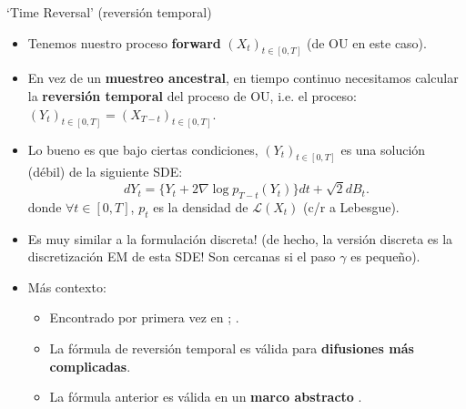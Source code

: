 \documentclass[aspectratio=169,xcolor=dvipsnames, t, spanish]{beamer}
\begin{document}
    \begin{frame}{`Time Reversal' (reversión temporal)}
        \begin{itemize}
        \item Tenemos nuestro proceso \textbf{forward} $(X_{t})_{t\in[0,T]}$ (de OU en este caso).
            \item En vez de un \textbf{muestreo ancestral}, en tiempo continuo necesitamos calcular la \textbf{reversión temporal} del proceso de OU, i.e. el proceso: $(Y_{t})_{t\in[0,T]}=(X_{T-t})_{t\in[0,T]}$.
            \pause
            \item Lo bueno es que bajo ciertas condiciones, $(Y_{t})_{t\in[0,T]}$ es una solución (débil) de la siguiente SDE:\vspace{-2mm}
            \[ dY_{t}=\{Y_{t}+2\nabla \log p_{T-t}(Y_{t})\}dt+\sqrt{2}dB_{t} . \]
            donde $\forall t\in[0,T]$, $p_{t}$ es la densidad de $\mathcal{L}(X_{t})$ (c/r a Lebesgue).
            \pause
            \item Es muy similar a la formulación discreta! (de hecho, la versión discreta es la discretización EM de esta SDE! Son cercanas si el paso $\gamma$ es pequeño).
            \item Más contexto:
            \begin{itemize}
                \item Encontrado por primera vez en \cite{Anderson1982}; \cite{HaussmannPardoux1986}.
                \item La fórmula de reversión temporal es válida para \textbf{difusiones más complicadas}.
                \item La fórmula anterior es válida en un \textbf{marco abstracto} \cite{Cattiaux2021}.
            \end{itemize}
        \end{itemize}
    \end{frame}
    
\end{document}
